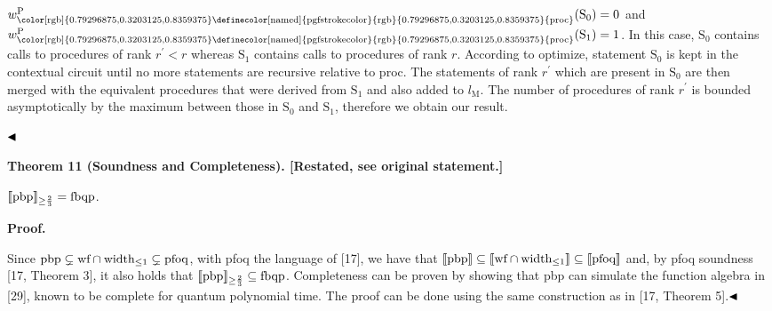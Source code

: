 \documentclass[10pt,a4paper]{amsart}
\begin{document}
$w_{\text{\color[rgb]{0.79296875,0.3203125,0.8359375}\definecolor[named]{%
pgfstrokecolor}{rgb}{0.79296875,0.3203125,0.8359375}{{proc}}}}^{\mathrm{P}}(%
\mathrm{S}_{0})=0$ and $w_{\text{\color[rgb]{0.79296875,0.3203125,0.8359375}\definecolor[named]{%
pgfstrokecolor}{rgb}{0.79296875,0.3203125,0.8359375}{{proc}}}}^{\mathrm{P}}(%
\mathrm{S}_{1})=1$. In this case, $\mathrm{S}_{0}$ contains calls to procedures of rank $r^{\prime}<r$ whereas $\mathrm{S}_{1}$ contains calls to procedures of rank $r$. According to optimize, statement $\mathrm{S}_{0}$ is kept in the contextual circuit until no more statements are recursive relative to proc. The statements of rank $r^{\prime}$ which are present in $\mathrm{S}_{0}$ are then merged with the equivalent procedures that were derived from $\mathrm{S}_{1}$ and also added to $l_{\text{M}}$. The number of procedures of rank $r^{\prime}$ is bounded asymptotically by the maximum between those in $\mathrm{S}_{0}$ and $\mathrm{S}_{1}$, therefore we obtain our result.\par
 
 
  
$\hfill\blacktriangleleft$\par
 
 
 
 
\par\medskip\noindent\textbf{Theorem 11 (Soundness and Completeness). [Restated, see original statement.]}\par
 
 
$\llbracket\textnormal{{pbp}}{}\rrbracket_{\geq\frac{2}{3}}=\textnormal{{fbqp}}{}$.\par
 
 
 
 
 
 
\par\medskip\noindent\textbf{Proof.}\par
 
 
Since $\textnormal{{pbp}}\subsetneq\textnormal{{wf}}\cap\textnormal{{width}}_{\leq 1}%
\subsetneq\textnormal{{pfoq}}{}$, with pfoq the language of [17], we have that $\llbracket\textnormal{{pbp}}{}\rrbracket\subseteq\llbracket\textnormal{{wf}}%
\cap\textnormal{{width}}_{\leq 1}\rrbracket\subseteq\llbracket\textnormal{{%
pfoq}}{}\rrbracket$ and, by pfoq soundness [17, Theorem 3], it also holds that $\llbracket\textnormal{{pbp}}{}\rrbracket_{\geq\frac{2}{3}}\subseteq\textnormal%
{{fbqp}}{}$. Completeness can be proven by showing that pbp can simulate the function algebra in [29], known to be complete for quantum polynomial time. The proof can be done using the same construction as in [17, Theorem 5].$\hfill\blacktriangleleft$\par
 
\end{document}
